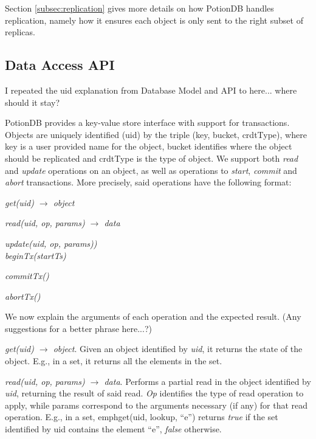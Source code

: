 \documentclass{vldb}
\newcommand{\grumbler}[2]{{\color{red}{\bf #1:} #2}}
\newcommand{\andre}[1]{\grumbler{andre}{#1}}
\newcommand{\emphvspace}{0.5\baselineskip}
\newcommand{\firstblockemph}[1]{\vspace{\emphvspace}\hspace{2em}\emph{#1}}
\newcommand{\middleblockemph}[1]{\hspace{2em}\emph{#1}}
\newcommand{\lastblockemph}[1]{\hspace{2em}\emph{#1}\vspace{\emphvspace}}
\begin{document}
Section \ref{subsec:replication} gives more details on how PotionDB handles replication, namely how it ensures each object is only sent to the right subset of replicas.




\subsection{Data Access API}

\andre{I repeated the uid explanation from Database Model and API to here... where should it stay?}

PotionDB provides a key-value store interface with support for transactions.
Objects are uniquely identified (uid) by the triple (key, bucket, crdtType), where key is a user provided name for the object, bucket identifies where the object should be replicated and crdtType is the type of object.
We support both \emph{read} and \emph{update} operations on an object, as well as operations to \emph{start}, \emph{commit} and \emph{abort} transactions.
More precisely, said operations have the following format:

\firstblockemph{get(uid) $\rightarrow$ object}

\middleblockemph{read(uid, op, params) $\rightarrow$ data}

\middleblockemph{update(uid, op, params))} \\

\middleblockemph{beginTx(startTs)}

\middleblockemph{commitTx()}

\lastblockemph{abortTx()}

We now explain the arguments of each operation and the expected result.
\andre(Any suggestions for a better phrase here...?)

\emph{get(uid) $\rightarrow$ object}. Given an object identified by \emph{uid}, it returns the state of the object.
E.g., in a set, it returns all the elements in the set.

\emph{read(uid, op, params) $\rightarrow$ data}. Performs a partial read in the object identified by \emph{uid}, returning the result of said read. 
\emph{Op} identifies the type of read operation to apply, while params correspond to the arguments necessary (if any) for that read operation.
E.g., in a set, emph{get(uid, lookup, ``e'')} returns \emph{true} if the set identified by uid contains the element ``e'', \emph{false} otherwise.
\end{document}
